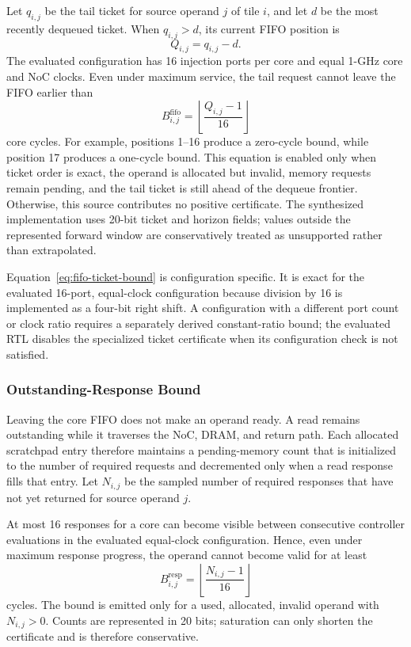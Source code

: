 Let $q_{i,j}$ be the tail ticket for source operand $j$ of tile $i$, and let
$d$ be the most recently dequeued ticket. When $q_{i,j}>d$, its current FIFO
position is
\begin{equation}
  Q_{i,j}=q_{i,j}-d.
  \label{eq:fifo-position}
\end{equation}
The evaluated configuration has 16 injection ports per core and equal 1-GHz
core and NoC clocks. Even under maximum service, the tail request cannot leave
the FIFO earlier than
\begin{equation}
  B^{\mathrm{fifo}}_{i,j}
    =\left\lfloor\frac{Q_{i,j}-1}{16}\right\rfloor
  \label{eq:fifo-ticket-bound}
\end{equation}
core cycles. For example, positions 1--16 produce a zero-cycle bound, while
position 17 produces a one-cycle bound. This equation is enabled only when
ticket order is exact, the operand is allocated but invalid, memory requests
remain pending, and the tail ticket is still ahead of the dequeue frontier.
Otherwise, this source contributes no positive certificate. The synthesized
implementation uses 20-bit ticket and horizon fields; values outside the
represented forward window are conservatively treated as unsupported rather
than extrapolated.

Equation~\ref{eq:fifo-ticket-bound} is configuration specific. It is exact
for the evaluated 16-port, equal-clock configuration because division by 16
is implemented as a four-bit right shift. A configuration with a different
port count or clock ratio requires a separately derived constant-ratio bound;
the evaluated RTL disables the specialized ticket certificate when its
configuration check is not satisfied.

\subsubsection{Outstanding-Response Bound}

Leaving the core FIFO does not make an operand ready. A read remains
outstanding while it traverses the NoC, DRAM, and return path. Each allocated
scratchpad entry therefore maintains a pending-memory count that is
initialized to the number of required requests and decremented only when a
read response fills that entry. Let $N_{i,j}$ be the sampled number of
required responses that have not yet returned for source operand $j$.

At most 16 responses for a core can become visible between consecutive
controller evaluations in the evaluated equal-clock configuration. Hence,
even under maximum response progress, the operand cannot become valid for at
least
\begin{equation}
  B^{\mathrm{resp}}_{i,j}
    =\left\lfloor\frac{N_{i,j}-1}{16}\right\rfloor
  \label{eq:response-drain-bound}
\end{equation}
cycles. The bound is emitted only for a used, allocated, invalid operand with
$N_{i,j}>0$. Counts are represented in 20 bits; saturation can only shorten
the certificate and is therefore conservative.

